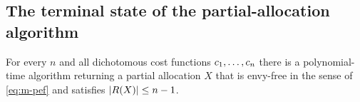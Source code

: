 
\subsection{The terminal state of the partial-allocation algorithm}
\label{sec:m-terminal}

\begin{theorem}
\label{thm:m-twyz}
For every $n$ and all dichotomous cost functions $c_1,\dots,c_n$ there
is a polynomial-time algorithm returning a partial allocation $X$ that is
envy-free in the sense of \eqref{eq:m-pef} and satisfies
$\left\lvert R(X)\right\rvert \le n-1$.
\end{theorem}


